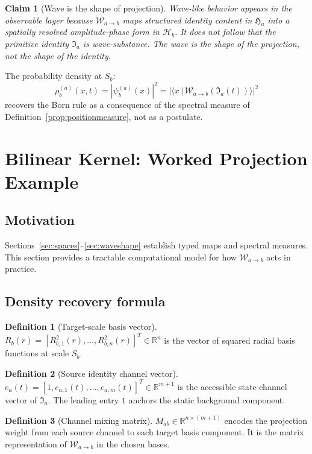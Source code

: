 \documentclass[12pt, a4paper]{article}
\theoremstyle{definition}
\newtheorem{defn}{Definition}[section]
\theoremstyle{plain}
\newtheorem{claim}{Claim}[section]
\theoremstyle{remark}
\newcommand{\Ia}{\mathfrak{I}_a}
\newcommand{\Ha}{\mathfrak{H}_a}        %
\newcommand{\Hb}{\mathcal{H}_b}         %
\newcommand{\Sb}{S_b}
\newcommand{\Wab}{\mathcal{W}_{a\to b}}   %
\newcommand{\psix}{\psi_b^{(a)}(x)}
\newcommand{\rhoab}{\rho_b^{(a)}}
\newcommand{\Rbvec}{R_b(r)}
\newcommand{\eavec}{e_a(t)}
\newcommand{\Mab}{M_{ab}}
\begin{document}
\begin{claim}[Wave is the shape of projection]
\label{claim:waveshape}
Wave-like behavior appears in the observable layer because
$\Wab$ maps structured identity content in $\Ha$ into
a spatially resolved amplitude-phase form in $\Hb$.
It does not follow that the primitive identity $\Ia$ is wave-substance.
The wave is the shape of the projection, not the shape of the identity.
\end{claim}

The probability density at $\Sb$:
\[
  \rhoab(x,t) = |\psix|^2
  = |\langle x\,|\,\Wab(\Ia(t))\rangle|^2
\]
recovers the Born rule as a consequence of the spectral measure
of Definition~\ref{prop:positionmeasure}, not as a postulate.


\section{Bilinear Kernel: Worked Projection Example}
\label{sec:kernel}

\subsection{Motivation}

Sections~\ref{sec:spaces}--\ref{sec:waveshape} establish typed maps
and spectral measures.
This section provides a tractable computational model for how
$\Wab$ acts in practice.

\subsection{Density recovery formula}

\begin{defn}[Target-scale basis vector]
\label{def:Rbvec}
$\Rbvec = [R_{b,1}^2(r),\ldots,R_{b,n}^2(r)]^T \in \mathbb{R}^n$
is the vector of squared radial basis functions at scale $\Sb$.
\end{defn}

\begin{defn}[Source identity channel vector]
\label{def:eavec}
$\eavec = [1, e_{a,1}(t),\ldots,e_{a,m}(t)]^T \in \mathbb{R}^{m+1}$
is the accessible state-channel vector of $\Ia$.
The leading entry $1$ anchors the static background component.
\end{defn}

\begin{defn}[Channel mixing matrix]
\label{def:Mab}
$\Mab \in \mathbb{R}^{n\times(m+1)}$ encodes the projection weight
from each source channel to each target basis component.
It is the matrix representation of $\Wab$ in the chosen bases.
\end{defn}
\end{document}
